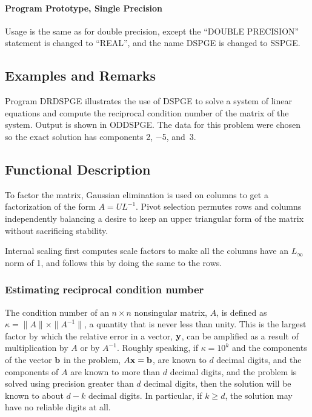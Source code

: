 \documentclass[twoside]{MATH77}
\begin{document}
\paragraph{Program Prototype, Single Precision}

Usage is the same as for double precision, except the ``DOUBLE
PRECISION'' statement is changed to ``REAL'', and the name DSPGE is
changed to SSPGE.

\subsection{Examples and Remarks}

Program DRDSPGE illustrates the use of DSPGE to solve a system
of linear equations and compute the reciprocal condition number of the
matrix of the system. Output is shown in ODDSPGE. The data for this problem
were chosen so the exact solution has components 2, $-$5, and~3.

\subsection{Functional Description}

To factor the matrix, Gaussian elimination is used on columns to get a
factorization of the form $A = U L^{-1}$.  Pivot selection permutes
rows and columns independently balancing a desire to keep an upper
triangular form of the matrix without sacrificing stability.

Internal scaling first computes scale factors to make all the columns
have an $L_\infty$ norm of 1, and follows this by doing the same to
the rows.

\subsubsection{Estimating reciprocal condition number}

The condition number of an $n\times n$ nonsingular matrix, $A$, is defined
as $\kappa = \|A\|\times \|A^{-1}\|$, a quantity that is never less than
unity.  This is the largest factor by which the relative error in a
vector, ${\bf y}$, can be amplified as a result of multiplication by $A$
or by $A^{-1}$.  Roughly speaking, if $\kappa = 10^k$ and the components
of the vector ${\bf b}$ in the problem, $A{\bf x} = {\bf b}$, are known to
$d$ decimal digits, and the components of $A$ are known to more than $d$
decimal digits, and the problem is solved using precision greater than $d$
decimal digits, then the solution will be known to about $d-k$ decimal
digits.  In particular, if $k \geq d$, the solution may have no reliable
digits at all.
\end{document}
